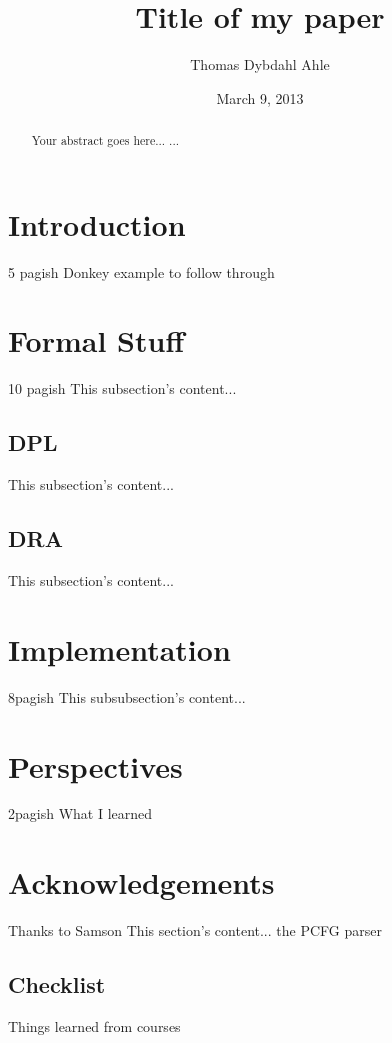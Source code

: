 \documentclass[12pt]{article}
\title{Title of my paper}
\author{Thomas Dybdahl Ahle}
\date{March 9, 2013}
\let\stdsection\section
\renewcommand\section{\newpage\stdsection}
\begin{document}
\maketitle

\begin{abstract}
Your abstract goes here...
...
\end{abstract}

\tableofcontents

\section{Introduction}
5 pagish
Donkey example to follow through

\section{Formal Stuff}
10 pagish
This subsection's content...
\subsection{DPL}
This subsection's content...
\subsection{DRA}
This subsection's content...

\section{Implementation}
8pagish
This subsubsection's content...

\section{Perspectives}
2pagish
What I learned

\section*{Acknowledgements}
Thanks to Samson
This section's content...\cite{visser1999donkey}
the PCFG parser\cite{klein2003accurate}

\subsection{Checklist}
Things learned from courses




\end{document}
